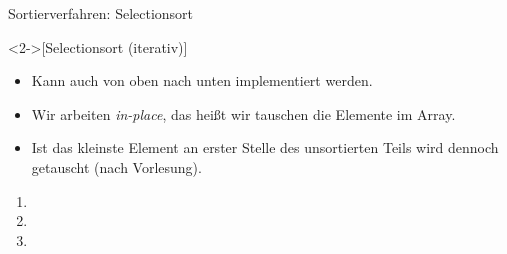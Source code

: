 \def\List#1#2{
    \foreach[count=\i,remember=\i as \li(initially 0)] \n in {#1}{
        \ifnum\i>#2
            \node[inner sep=4pt,ball,outer sep=2pt] (\i) at(1.25*\i,0) {\n};
        \else
            \node[inner sep=4pt,iball,outer sep=2pt] (\i) at(1.25*\i,0) {\n};
        \fi
        \ifnum\i>1
            \draw (\li.east) -- (\i.west);
        \fi
    }
}

\begin{frame}{Sortierverfahren: Selectionsort}
    \begin{definition}<2->[Selectionsort \hfill{}(iterativ)]
    \end{definition}
    \begin{itemize}[<+(1)->]
        \item Kann auch von oben nach unten implementiert werden.
        \item Wir arbeiten \emph{in-place}, das heißt wir tauschen die Elemente im Array.
        \item Ist das kleinste Element an erster Stelle des unsortierten Teils wird dennoch getauscht (nach Vorlesung).
    \end{itemize}
    \vfill
    \begin{center}\pause{}
        \begin{minipage}{0.9\linewidth}
            \begin{multicols}{2}
                \begin{enumerate}[<+(1)->]
                    \item {}
                    \item {}
                    \item \begin{tikzpicture}[scale=0.65,every node/.style={transform shape},baseline=-0.6ex]

\end{tikzpicture}
\end{enumerate}
\end{multicols}
\end{minipage}
\end{center}
\end{frame}
